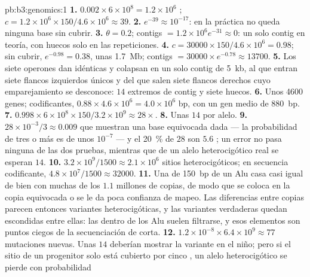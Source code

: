 \begin{solution}{pb:b3:genomics:1}
\textbf{1.} $0.002\times 6\times 10^{8} = 1.2\times 10^{6}$ ;
$c = 1.2\times 10^{6}\times 150/4.6\times 10^{6} \approx 39$.
\textbf{2.} $e^{-39} \approx 10^{-17}$: en la práctica no queda ninguna
base sin cubrir.
\textbf{3.} $\theta = 0.2$; contigs $= 1.2\times 10^{6} e^{-31} \approx
0$: un solo contig en teoría, con huecos solo en las repeticiones.
\textbf{4.} $c = \num{30000}\times 150/4.6\times 10^{6} = 0.98$; sin
cubrir, $e^{-0.98} = 0.38$, unas \qty{1.7}{Mb}; contigs $= \num{30000}
\times e^{-0.78} \approx \num{13700}$.
\textbf{5.} Los siete operones dan  idénticas y colapsan en un
solo contig de \qty{5}{kb}, al que entran siete flancos izquierdos únicos
y del que salen siete flancos derechos cuyo emparejamiento se desconoce:
$14$ extremos de contig y siete huecos.
\textbf{6.} Unos \num{4600} genes; codificantes, $0.88\times 4.6\times 10^{6}
= 4.0\times 10^{6}$ bp, con un gen medio de \qty{880}{bp}.
\textbf{7.} $0.998\times 6\times 10^{8}\times 150/3.2\times 10^{9}
\approx 28\times$.
\textbf{8.} Unas $14$  por alelo.
\textbf{9.} $28\times 10^{-3}/3 \approx 0.009$  que muestran una
base equivocada dada --- la probabilidad de tres o más es de unos
$10^{-7}$ --- y el \qty{20}{\%} de $28$ son $5.6$ ; un error no
pasa ninguna de las dos pruebas, mientras que de un alelo heterocigótico
real se esperan $14$.
\textbf{10.} $3.2\times 10^{9}/1500 \approx 2.1\times 10^{6}$ sitios
heterocigóticos; en secuencia codificante, $4.8\times 10^{7}/1500 \approx
\num{32000}$.
\textbf{11.} Una  de \qty{150}{bp} de un Alu casa casi igual de
bien con muchas de los $1.1$ millones de copias, de modo que se coloca en
la copia equivocada o se le da poca confianza de mapeo. Las diferencias
entre copias parecen entonces variantes heterocigóticas, y las variantes
verdaderas quedan escondidas entre ellas: las 
dentro de los Alu suelen filtrarse, y esos elementos son puntos ciegos de
la secuenciación de  corta.
\textbf{12.} $1.2\times 10^{-8}\times 6.4\times 10^{9} \approx 77$
mutaciones nuevas. Unas $14$  deberían mostrar la variante en el
niño; pero si el sitio de un progenitor solo está cubierto por cinco
, un alelo heterocigótico se pierde con probabilidad

\end{solution}
